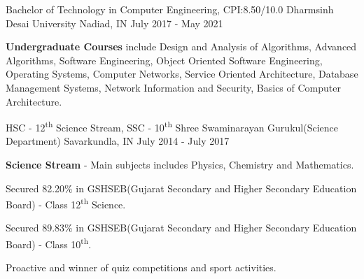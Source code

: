 
\begin{cventries}
  \cventry
    {Bachelor of Technology in Computer Engineering, CPI:8.50/10.0} %
    {Dharmsinh Desai University} %
    {Nadiad, IN} %
    {July 2017 - May 2021} %
    {
      \begin{cvitems} %
         \item {\textbf{Undergraduate Courses} include Design and Analysis of Algorithms, Advanced Algorithms, Software Engineering, Object Oriented
Software Engineering, Operating Systems, Computer Networks, Service Oriented Architecture, Database Management Systems,
Network Information and Security, Basics of Computer Architecture.}
         \vspace{0.5mm}
      \end{cvitems}
    }
    
\end{cventries}
\begin{cventries}
  \cventry
    {HSC - 12\textsuperscript{th} Science Stream, SSC - 10\textsuperscript{th}} %
    {Shree Swaminarayan Gurukul(Science Department)} %
    {Savarkundla, IN} %
    {July 2014 - July 2017} %
    {
      \begin{cvitems} %
         \item {\textbf{Science Stream} -  Main subjects includes Physics, Chemistry and Mathematics.}
         \vspace{0.5mm}
          \item {Secured 82.20\% in GSHSEB(Gujarat Secondary and Higher Secondary Education Board) - Class 12\textsuperscript{th} Science.}
          \vspace{0.5mm}
          \item {Secured 89.83\% in GSHSEB(Gujarat Secondary and Higher Secondary Education Board) - Class 10\textsuperscript{th}.}
          \vspace{0.5mm}
          \item {Proactive and winner of quiz competitions and sport activities.}
          \vspace{0.5mm}
      \end{cvitems}
    }
    
\end{cventries}
